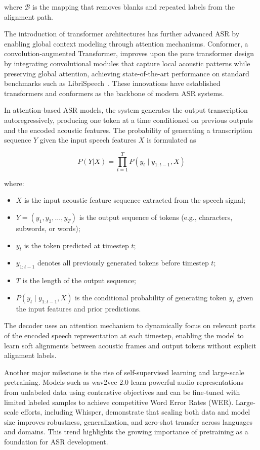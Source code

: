 where $\mathcal{B}$ is the mapping that removes blanks and repeated labels from the alignment path.


The introduction of transformer architectures has further advanced ASR by enabling global context modeling through attention mechanisms. Conformer, a convolution-augmented Transformer, improves upon the pure transformer design by integrating convolutional modules that capture local acoustic patterns while preserving global attention, achieving state-of-the-art performance on standard benchmarks such as LibriSpeech~\cite{gulati2020conformer, panayotov2015librispeech}. These innovations have established transformers and conformers as the backbone of modern ASR systems.

In attention-based ASR models, the system generates the output transcription autoregressively, producing one token at a time conditioned on previous outputs and the encoded acoustic features. The probability of generating a transcription sequence $Y$ given the input speech features $X$ is formulated as

\begin{equation*}
    P(Y|X) = \prod_{t=1}^{T} P(y_t \mid y_{1:t-1}, X)
\end{equation*}

where:
\begin{itemize}
    \item $X$ is the input acoustic feature sequence extracted from the speech signal;
    \item $Y = (y_1, y_2, \dots, y_T)$ is the output sequence of tokens (e.g., characters, subwords, or words);
    \item $y_t$ is the token predicted at timestep $t$;
    \item $y_{1:t-1}$ denotes all previously generated tokens before timestep $t$;
    \item $T$ is the length of the output sequence;
    \item $P(y_t \mid y_{1:t-1}, X)$ is the conditional probability of generating token $y_t$ given the input features and prior predictions.
\end{itemize}

The decoder uses an attention mechanism to dynamically focus on relevant parts of the encoded speech representation at each timestep, enabling the model to learn soft alignments between acoustic frames and output tokens without explicit alignment labels.

Another major milestone is the rise of self-supervised learning and large-scale pretraining. Models such as wav2vec 2.0 learn powerful audio representations from unlabeled data using contrastive objectives and can be fine-tuned with limited labeled samples to achieve competitive Word Error Rates (WER). Large-scale efforts, including Whisper, demonstrate that scaling both data and model size improves robustness, generalization, and zero-shot transfer across languages and domains. This trend highlights the growing importance of pretraining as a foundation for ASR development.


